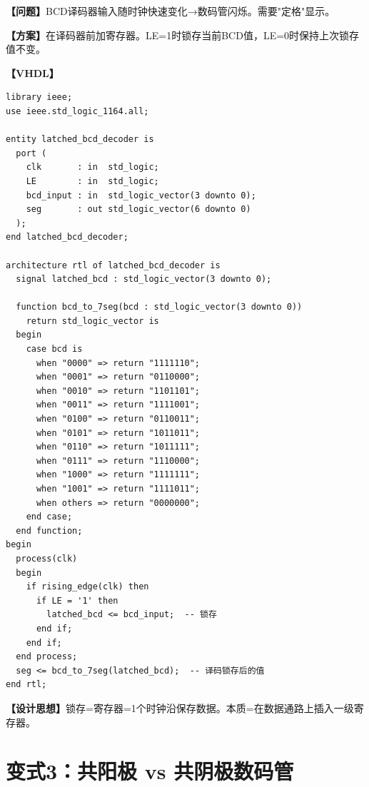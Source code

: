 \begin{detailbox}[完整教学]
\textbf{【问题】}BCD译码器输入随时钟快速变化→数码管闪烁。需要"定格"显示。

\textbf{【方案】}在译码器前加寄存器。LE=1时锁存当前BCD值，LE=0时保持上次锁存值不变。

\textbf{【VHDL】}
\begin{lstlisting}
library ieee;
use ieee.std_logic_1164.all;

entity latched_bcd_decoder is
  port (
    clk       : in  std_logic;
    LE        : in  std_logic;
    bcd_input : in  std_logic_vector(3 downto 0);
    seg       : out std_logic_vector(6 downto 0)
  );
end latched_bcd_decoder;

architecture rtl of latched_bcd_decoder is
  signal latched_bcd : std_logic_vector(3 downto 0);

  function bcd_to_7seg(bcd : std_logic_vector(3 downto 0))
    return std_logic_vector is
  begin
    case bcd is
      when "0000" => return "1111110";
      when "0001" => return "0110000";
      when "0010" => return "1101101";
      when "0011" => return "1111001";
      when "0100" => return "0110011";
      when "0101" => return "1011011";
      when "0110" => return "1011111";
      when "0111" => return "1110000";
      when "1000" => return "1111111";
      when "1001" => return "1111011";
      when others => return "0000000";
    end case;
  end function;
begin
  process(clk)
  begin
    if rising_edge(clk) then
      if LE = '1' then
        latched_bcd <= bcd_input;  -- 锁存
      end if;
    end if;
  end process;
  seg <= bcd_to_7seg(latched_bcd);  -- 译码锁存后的值
end rtl;
\end{lstlisting}

\textbf{【设计思想】}锁存=寄存器=1个时钟沿保存数据。本质=在数据通路上插入一级寄存器。
\end{detailbox}


\section{变式3：共阳极 vs 共阴极数码管}

